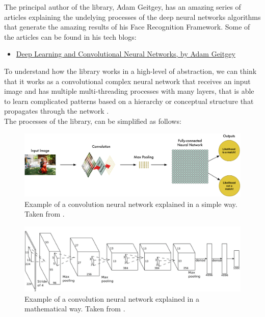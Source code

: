\documentclass[11pt]{report} %
\begin{document}
The principal author of the library, Adam Geitgey, has an amazing series of articles explaining the undelying processes of the deep neural networks algorithms that generate the amazing results of his Face Recognition Framework. Some of the articles can be found in his tech blogs:

\begin{itemize}
    \color{blue}
    \item \href{https://medium.com/@ageitgey/machine-learning-is-fun-part-3-deep-learning-and-convolutional-neural-networks-f40359318721}{Deep Learning and Convolutional Neural Networks, by Adam Geitgey}
\end{itemize}

To understand how the library works in a high-level of abstraction, we can think that it works as a convolutional complex neural network that receives an input image and has multiple multi-threading processes with many layers, that is able to learn complicated patterns based on a hierarchy or conceptual structure that propagates through the network \citep{cite_face_detect_face_recognition_github_repo}.\\

The processes of the library, can be simplified as follows:

\begin{figure}[H]
    \centering
    \includegraphics[width=1.01\linewidth]{assets/imgs/computer_vision/face_recognition_convolutional_neural_network_explained.png}
    \caption{Example of a convolution neural network explained in a simple way. Taken from \citep{cite_adam_geitgey_machine_learning_convolutional_network_fun}.} 
    \label{fig_convolutional_neural_network_easy}
\end{figure}

\begin{figure}[H]
    \centering
    \includegraphics[width=1.01\linewidth]{assets/imgs/computer_vision/face_recognition_convolutional_neural_network_more_steps.png}
    \caption{Example of a convolution neural network explained in a mathematical way. Taken from \citep{cite_adam_geitgey_machine_learning_convolutional_network_fun}.} 
    \label{fig_convolutional_neural_network_complex}
\end{figure}
\end{document}
